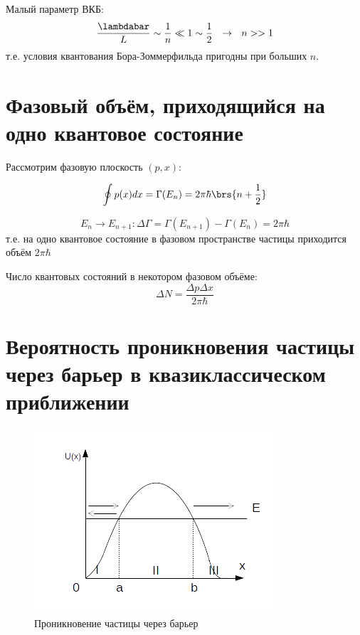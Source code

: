Малый параметр ВКБ:
$$
\frac{\lambdabar}{L} \sim \frac{1}{n} \ll 1 \sim \frac{1}{2} ~~\rightarrow~~ n >> 1
$$
т.е. условия квантования Бора-Зоммерфильда пригодны при больших $n$.

\section{Фазовый объём, приходящийся на одно квантовое состояние}

Рассмотрим фазовую плоскость $(p,x)$:

$$
\oint p(x)dx = \Gamma(E_n) = 2\pi\hbar\brs{n+\frac{1}{2}}
$$

$$
E_n \to E_{n+1}: \boxed{\Delta\Gamma = \Gamma(E_{n+1}) - \Gamma(E_n) = 2\pi\hbar}
$$
т.е. на одно квантовое состояние в фазовом пространстве частицы приходится объём $2\pi\hbar$

Число квантовых состояний в некотором фазовом объёме:
$$
\boxed{\Delta N = \frac{\Delta p \Delta x}{2\pi\hbar}}
$$

\begin{sloppypar}
  \section{Вероятность проникновения частицы через барьер в квазиклассическом приближении}
\end{sloppypar}

\begin{figure}[h]
\centering
\includegraphics[scale=1]{figs/11_5}
\caption{Проникновение частицы через барьер}
\label{fig:11_5}
\end{figure}


